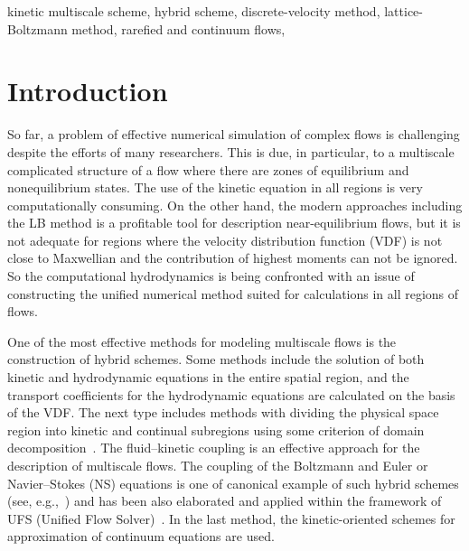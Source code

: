 \documentclass[]{elsarticle} %
\begin{document}
\begin{frontmatter}
\begin{abstract}
\end{abstract}

\begin{keyword}
kinetic multiscale scheme,
hybrid scheme,
discrete-velocity method,
lattice-Boltzmann method,
rarefied and continuum flows,
\end{keyword}

\end{frontmatter}

\linenumbers

\section{Introduction}\label{sec:intro}

So far, a problem of effective numerical simulation of complex flows is challenging despite the efforts of many researchers.
This is due, in particular, to a multiscale complicated structure of a flow where there are zones of equilibrium and nonequilibrium states.
The use of the kinetic equation in all regions is very computationally consuming.
On the other hand, the modern approaches including the LB method is a profitable tool for description near-equilibrium flows,
but it is not adequate for regions where the velocity distribution function (VDF) is not close to Maxwellian
and the contribution of highest moments can not be ignored.
So the computational hydrodynamics is being confronted with an issue of constructing the unified numerical method
suited for calculations in all regions of flows.

One of the most effective methods for modeling multiscale flows is the construction of hybrid schemes.
Some methods include the solution of both kinetic and hydrodynamic equations in the entire spatial region,
and the transport coefficients for the hydrodynamic equations are calculated on the basis of the VDF.
The next type includes methods with dividing the physical space region into kinetic
and continual subregions using some criterion of domain decomposition~\cite{Dimarco2014}.
The fluid--kinetic coupling is an effective approach for the description of multiscale flows.
The coupling of the Boltzmann and Euler or Navier--Stokes (NS) equations is one of canonical example of such hybrid schemes
(see, e.g.,~\cite{Bourgat1996, Tallec1997})
and has been also elaborated and applied within the framework of UFS (Unified Flow Solver)~\cite{Kolobov2007}.
In the last method, the kinetic-oriented schemes for approximation of continuum equations are used.
\end{document}
